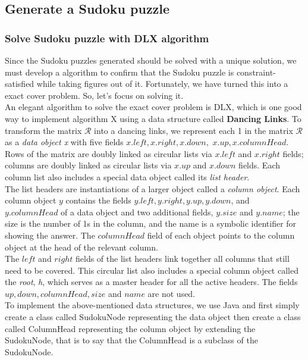 \documentclass{mcmthesis}
\begin{document}
\subsection{Generate a Sudoku puzzle}
\subsubsection{Solve Sudoku puzzle with DLX algorithm}
\indent Since the Sudoku puzzles generated should be solved with a unique solution, we must develop a algorithm to confirm that the Sudoku puzzle is constraint-satisfied while taking figures out of it. Fortunately, we have  turned this into a exact cover problem. So, let's focus on solving it. \\ 
\indent An elegant algorithm to solve the exact cover problem is DLX, which is one good way to implement algorithm X using a data structure called
\textbf{Dancing Links}. To transform the matrix $\mathcal{R}$ into a dancing links, we represent each 1 in the matrix $\mathcal{R}$ as a \textit{data object x} with five fields $x.left, x.right, x.down,$ $ x.up, x.columnHead$. Rows of the matrix are doubly linked as circular lists via $x.left$ and $x.right$ fields; columns are doubly linked as circular lists via $x.up$ and $x.down$ fields. Each column list also includes a special data object called its \textit{list header}.\\
\indent The list headers are instantiations of a larger object called a \textit{column object}. Each column object $y$ contains the fields $y.left, y.right, y.up, y.down$, and $y.columnHead$ of a data object and two additional fields, $y.size$ and $y.name$; the size is the number of 1s in the column, and the name is a symbolic identifier for showing the answer. The $columnHead$ field of each object points to the column object at the head of the relevant column.\\
\indent The $left$ and $right$ fields of the list headers link together all columns that still need to be covered. This circular list also includes a special column object called the \textit{root}, \textit{h}, which serves as a master header for all the active headers. The fields $up, down, columnHead, size$ and $name$ are not used.\\
\indent To implement the above-mentioned data structures, we use Java and first simply create a class called SudokuNode representing the data object then create a class called ColumnHead representing the column object by extending the SudokuNode, that is to say that the ColumnHead is a subclass of the SudokuNode.\\
\end{document}
